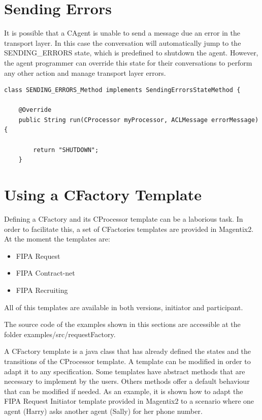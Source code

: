 \section{Sending Errors} %
\label{sec:sending_errors}

It is possible that a CAgent is unable to send a message due an error in the transport layer. In this case the conversation will automatically jump to the SENDING\_ERRORS state, which is predefined to shutdown the agent. However, the agent programmer can override this state for their conversations to perform any other action and manage transport layer errors.

\begin{lstlisting}[style=Java]
class SENDING_ERRORS_Method implements SendingErrorsStateMethod {

	@Override
	public String run(CProcessor myProcessor, ACLMessage errorMessage) {

		return "SHUTDOWN";
	}
\end{lstlisting}


\section{Using a CFactory Template}
\label{subsec:usingATemplate}
Defining a CFactory and its CProcessor template can be a laborious task. In order to facilitate this, a set of CFactories templates are provided in Magentix2. At the moment the templates are:
\begin{itemize}
 \item FIPA Request
 \item FIPA Contract-net
 \item FIPA Recruiting
\end{itemize}
All of this templates are available in both versions, initiator and participant.

The source code of the examples shown in this sections are accessible at the folder examples/src/requestFactory.

A CFactory template is a java class that has already defined the states and the transitions of the CProcessor template. A template can be modified in order to adapt it to any specification. Some templates have abstract methods that are necessary to implement by the users. Others methods offer a default behaviour that can be modified if needed. As an example, it is shown how to adapt the FIPA Request Initiator template provided in Magentix2 to a scenario where one agent (Harry) asks another agent (Sally) for her phone number.

